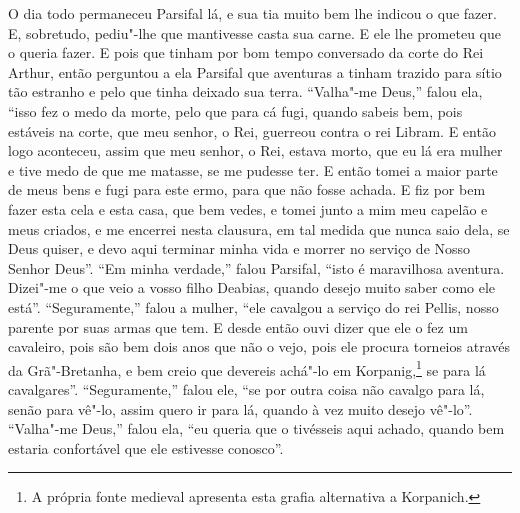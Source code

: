 O dia todo permaneceu Parsifal lá, e sua tia muito bem lhe indicou o que
fazer. E, sobretudo, pediu"-lhe que mantivesse casta sua carne. E ele lhe
prometeu que o queria fazer. E pois que tinham por bom tempo conversado da
corte do Rei Arthur, então perguntou a ela Parsifal que aventuras a tinham
trazido para sítio tão estranho e pelo que tinha deixado sua terra. “Valha"-me
Deus,” falou ela, “isso fez o medo da morte, pelo que para cá fugi, quando
sabeis bem, pois estáveis na corte, que meu senhor, o Rei, guerreou contra o
rei Libram. E então logo aconteceu, assim que meu senhor, o Rei, estava morto,
que eu lá era mulher e tive medo de que me matasse, se me pudesse ter. E então
tomei a maior parte de meus bens e fugi para este ermo, para que não fosse
achada. E fiz por bem fazer esta cela e esta casa, que bem vedes, e tomei junto
a mim meu capelão e meus criados, e me encerrei nesta clausura, em tal medida
que nunca saio dela, se Deus quiser, e devo aqui terminar minha vida e morrer
no serviço de Nosso Senhor Deus”. “Em minha verdade,” falou Parsifal, ``isto é
maravilhosa aventura. Dizei"-me o que veio a vosso filho Deabias, quando desejo
muito saber como ele está”. “Seguramente,” falou a mulher, “ele cavalgou a
serviço do rei Pellis, nosso parente por suas armas que tem. E desde então ouvi
dizer que ele o fez um cavaleiro, pois são bem dois anos que não o vejo, pois
ele procura torneios através da Grã"-Bretanha, e bem creio que devereis achá"-lo
em Korpanig,\footnote{ A própria fonte medieval apresenta esta grafia
alternativa a Korpanich.}  se para lá cavalgares”. “Seguramente,”
falou ele, ``se por outra coisa não cavalgo para lá, senão para vê"-lo, assim
quero ir para lá, quando à vez muito desejo vê"-lo”. “Valha"-me Deus,” falou ela,
“eu queria que o tivésseis aqui achado, quando bem estaria confortável que ele
estivesse conosco”. 

